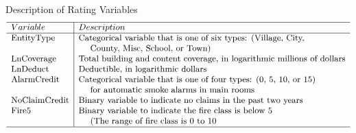 \documentclass[]{book}
\theoremstyle{definition}
\theoremstyle{definition}
\theoremstyle{definition}
\theoremstyle{remark}
\begin{document}
Description of Rating Variables \[{\small \begin{matrix}
\begin{array}{ l | l}
\hline
Variable    & Description \\
\hline
\text{EntityType}   & \text{Categorical variable that is one of six types:  (Village, City,} \\
& ~~~~ \text{County, Misc, School, or Town)} \\
\text{LnCoverage}   & \text{Total building and content coverage, in logarithmic millions of dollars}\\
\text{LnDeduct}     & \text{Deductible, in logarithmic dollars} \\
\text{AlarmCredit}  & \text{Categorical variable that is one of four types:  (0, 5, 10, or 15)} \\
 &  ~~~~   \text{for automatic smoke alarms in main rooms} \\
\text{NoClaimCredit}    & \text{Binary variable to indicate no claims in the past two years} \\
\text{Fire5 }           & \text{Binary variable to indicate the fire class is below 5} \\
& ~~~~ \text{(The range of fire class is 0 to 10} \\
\hline
\end{array}
\end{matrix}}\]
\end{document}
